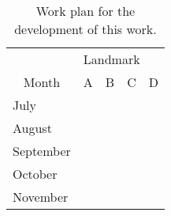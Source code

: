 \begin{table}[ht]
	\centering
	\begin{tabular}{|l|llll|}
		\hline
		\multicolumn{1}{|c|}{}                        & \multicolumn{4}{l|}{Landmark}                                                                                                                                                                                                                                        \\ \cline{2-5} 
		\multicolumn{1}{|c|}{\multirow{-2}{*}{Month}} & \multicolumn{1}{l|}{A}                                               & \multicolumn{1}{l|}{B}                                               & \multicolumn{1}{l|}{C}                                               & D                                               \\ \hline
		July                                          & \multicolumn{1}{l|}{\cellcolor[HTML]{000000}}                        & \multicolumn{1}{l|}{\cellcolor[HTML]{000000}}                        & \multicolumn{1}{l|}{}                                                &                                                 \\ \hline
		August                                        & \multicolumn{1}{l|}{} & \multicolumn{1}{l|}{\cellcolor[HTML]{000000}{\color[HTML]{000000} }} & \multicolumn{1}{l|}{\cellcolor[HTML]{000000}}                        &                                                 \\ \hline
		September                                     & \multicolumn{1}{l|}{}                                                & \multicolumn{1}{l|}{} & \multicolumn{1}{l|}{\cellcolor[HTML]{000000}} & \cellcolor[HTML]{000000}{\color[HTML]{000000} } \\ \hline
		October                                       & \multicolumn{1}{l|}{}                                                & \multicolumn{1}{l|}{}                                                & \multicolumn{1}{l|}{\cellcolor[HTML]{000000}}                        & \cellcolor[HTML]{000000}                        \\ \hline
		November                                      & \multicolumn{1}{l|}{}                                                & \multicolumn{1}{l|}{}                                                & \multicolumn{1}{l|}{}                                                & \cellcolor[HTML]{000000}                        \\ \hline
	\end{tabular}
	\caption{Work plan for the development of this work.} \label{tab:work_plan}
\end{table}